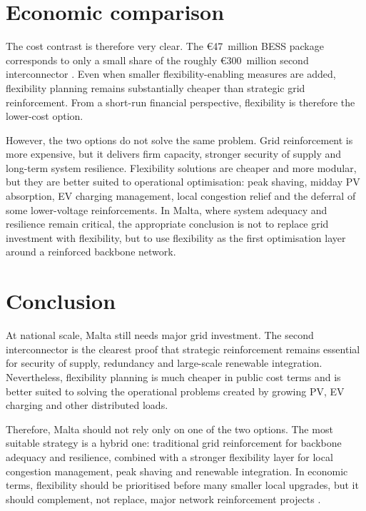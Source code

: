 \documentclass[10pt, a4paper, twoside, twocolumn]{book}
\begin{document}
\section{Economic comparison}

The cost contrast is therefore very clear. The \euro47~million BESS package corresponds to only a small share of the roughly \euro300~million second interconnector \cite{gov_ic2_2025,eu_bess_tender_2024}. Even when smaller flexibility-enabling measures are added, flexibility planning remains substantially cheaper than strategic grid reinforcement. From a short-run financial perspective, flexibility is therefore the lower-cost option.

However, the two options do not solve the same problem. Grid reinforcement is more expensive, but it delivers firm capacity, stronger security of supply and long-term system resilience. Flexibility solutions are cheaper and more modular, but they are better suited to operational optimisation: peak shaving, midday PV absorption, EV charging management, local congestion relief and the deferral of some lower-voltage reinforcements. In Malta, where system adequacy and resilience remain critical, the appropriate conclusion is not to replace grid investment with flexibility, but to use flexibility as the first optimisation layer around a reinforced backbone network.

\section{Conclusion}

At national scale, Malta still needs major grid investment. The second interconnector is the clearest proof that strategic reinforcement remains essential for security of supply, redundancy and large-scale renewable integration. Nevertheless, flexibility planning is much cheaper in public cost terms and is better suited to solving the operational problems created by growing PV, EV charging and other distributed loads.

Therefore, Malta should not rely only on one of the two options. The most suitable strategy is a hybrid one: traditional grid reinforcement for backbone adequacy and resilience, combined with a stronger flexibility layer for local congestion management, peak shaving and renewable integration. In economic terms, flexibility should be prioritised before many smaller local upgrades, but it should complement, not replace, major network reinforcement projects \cite{gov_ic2_2025,eu_bess_tender_2024,ewa_necp_2025,rews_nationalreport_2025}.

\printbibliography[heading=subbibliography, title={References}]
\end{document}

